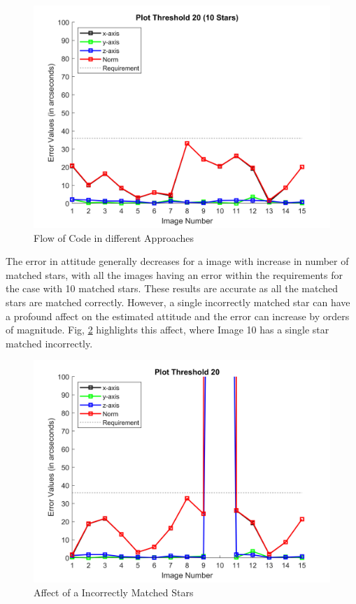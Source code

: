 \documentclass[../../main.tex]{subfiles}
\begin{document}
{{{\begin{figure}
\includegraphics[scale=0.55]{Figures/GNC/Result_Plot_Threshold_20_10stars.png}
\caption{Flow of Code in different Approaches}
\label{sec:esti_result_variation}
\end{figure}

The error in attitude generally decreases for a image with increase in number of matched stars, with all the images having an error within the requirements for the case with 10 matched stars. These results are accurate as all the matched stars are matched correctly. However, a single incorrectly matched star can have a profound affect on the estimated attitude and the error can increase by orders of magnitude. Fig, \ref{sec:esti_result_flaw} highlights this affect, where Image 10 has a single star matched incorrectly. 
\begin{figure}
\centering
\includegraphics[scale=0.70]{Figures/GNC/Result_Plot_Threshold_20.png}
\caption{Affect of a Incorrectly Matched Stars}
\label{sec:esti_result_flaw}
\end{figure}

}}}
\end{document}
